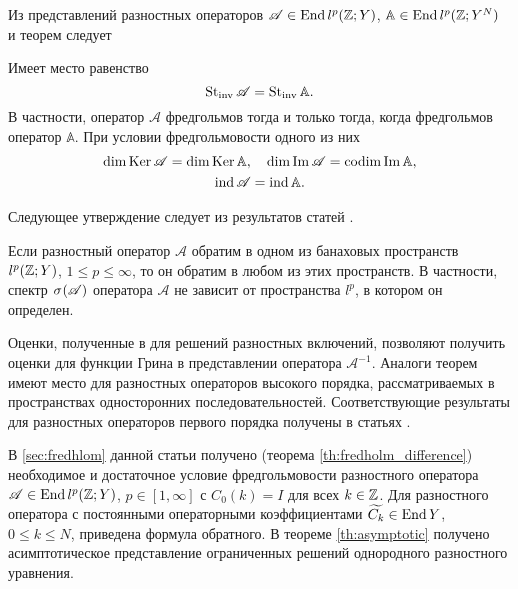 Из представлений  разностных операторов $\mathcal A \in \operatorname{End} l^p(\mathbb{Z}; Y)$, $\mathbb A \in \operatorname{End} l^p(\mathbb{Z}; Y^N)$ и теорем  следует
\begin{theorem}\label{th:stinvdiff}
    Имеет место равенство
    \[ \operatorname{St_{inv}} \mathcal A = \operatorname{St_{inv}} \mathbb A. \]
    В частности, оператор $\mathcal A$ фредгольмов тогда и только тогда, когда фредгольмов оператор $\mathbb A$. При условии фредгольмовости одного из них
    \begin{gather*}
    \dim \operatorname{Ker} \mathcal A = \dim \operatorname{Ker} \mathbb A, \quad \dim \operatorname{Im} \mathcal A = \operatorname{codim} \operatorname{Im} \mathbb A, \\
    \operatorname{ind} \mathcal A = \operatorname{ind} \mathbb A.
    \end{gather*}
\end{theorem}

Следующее утверждение следует из результатов статей \cite{inverse1992,memory2014}.
\begin{theorem}\label{th:inverseall}
    Если разностный оператор $\mathcal A$ обратим в одном из банаховых пространств $l^p(\mathbb{Z}; Y)$, $1 \leq p \leq \infty$, то он обратим в любом из этих пространств. В частности, спектр $\spectrum{\mathcal{A}}$ оператора $\mathcal A$ не зависит от пространства $l^p$, в котором он определен.
\end{theorem}

Оценки, полученные в \cite{green2015} для решений разностных включений, позволяют получить оценки для функции Грина в представлении оператора $\mathcal A^{-1}$. Аналоги теорем  имеют место для разностных операторов высокого порядка, рассматриваемых в пространствах односторонних последовательностей. Соответствующие результаты для разностных операторов первого порядка получены в статьях \cite{inverse1992,Bas13}.

В \textsection \ref{sec:fredhlom} данной статьи получено (теорема \ref{th:fredholm_difference}) необходимое и достаточное условие фредгольмовости разностного оператора $\mathcal A \in \operatorname{End} l^p(\mathbb{Z}; Y)$, $p \in [1, \infty]$ с $C_0(k) = I$ для всех $k \in \mathbb{Z}$. Для разностного оператора с постоянными операторными коэффициентами $\widetilde{C_k} \in \operatorname{End} Y$, $0 \leq k \leq N$, приведена формула обратного. В теореме \ref{th:asymptotic} получено асимптотическое представление ограниченных решений однородного разностного уравнения.
